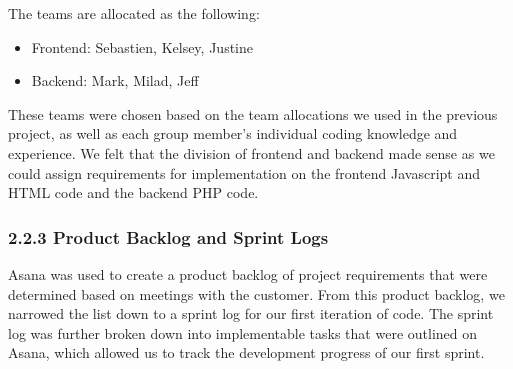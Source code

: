 \documentclass[]{article}
\begin{document}
The teams are allocated as the following:

\begin{itemize}
\itemsep1pt\parskip0pt
\item
  Frontend: Sebastien, Kelsey, Justine
\item
  Backend: Mark, Milad, Jeff
\end{itemize}

These teams were chosen based on the team allocations we used in the
previous project, as well as each group member's individual coding
knowledge and experience. We felt that the division of frontend and
backend made sense as we could assign requirements for implementation on
the frontend Javascript and HTML code and the backend PHP code.

\subsubsection{2.2.3 Product Backlog and Sprint
Logs}\label{product-backlog-and-sprint-logs}

Asana was used to create a product backlog of project requirements that
were determined based on meetings with the customer. From this product
backlog, we narrowed the list down to a sprint log for our first
iteration of code. The sprint log was further broken down into
implementable tasks that were outlined on Asana, which allowed us to
track the development progress of our first sprint.
\end{document}
